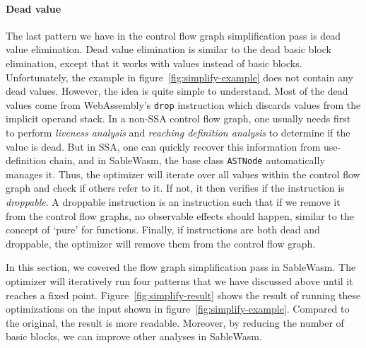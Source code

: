 \paragraph{Dead value}
The last pattern we have in the control flow graph simplification pass is dead
value elimination. Dead value elimination is similar to the dead basic block
elimination, except that it works with values instead of basic blocks.
Unfortunately, the example in figure~\ref{fig:simplify-example} does not contain
any dead values. However, the idea is quite simple to understand. Most of the
dead values come from WebAssembly's \texttt{drop} instruction which discards
values from the implicit operand stack. In a non-SSA control flow graph, one
usually needs first to perform \emph{liveness analysis} and \emph{reaching
    definition analysis} to determine if the value is dead. But in SSA, one can
quickly recover this information from use-definition chain, and in SableWasm,
the base class \texttt{ASTNode} automatically manages it. Thus, the optimizer
will iterate over all values within the control flow graph and check if others
refer to it. If not, it then verifies if the instruction is \emph{droppable}.
A droppable instruction is an instruction such that if we remove it from the
control flow graphs, no observable effects should happen, similar to the
concept of `pure' for functions. Finally, if instructions are both dead and
droppable, the optimizer will remove them from the control flow graph.

In this section, we covered the flow graph simplification pass in SableWasm. The
optimizer will iteratively run four patterns that we have discussed above until
it reaches a fixed point. Figure~\ref{fig:simplify-result} shows the result of
running these optimizations on the input shown in
figure~\ref{fig:simplify-example}. Compared to the original, the result is more
readable. Moreover, by reducing the number of basic blocks, we can improve other
analyses in SableWasm.
